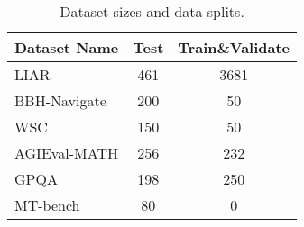 \begin{table}[htbp]
\caption{Dataset sizes and data splits.}
\label{tab:dataset}
\renewcommand\tabcolsep{3.2pt}
\renewcommand\arraystretch{1.2}
\small
\setlength{\abovecaptionskip}{0.1cm}
\setlength{\belowcaptionskip}{-0.2cm}
\centering
\begin{tabular}{l|cc}
\hline

\hline

\hline

\hline
\textbf{Dataset Name} & \textbf{Test} & \textbf{Train\&Validate} \\
\hline

\hline
LIAR & 461 & 3681  \\
BBH-Navigate & 200 & 50  \\
WSC & 150 & 50  \\
AGIEval-MATH & 256 & 232 \\
GPQA & 198 & 250  \\
\hline
MT-bench & 80 & 0  \\

\hline

\hline

\hline

\hline
\end{tabular}
\end{table}

